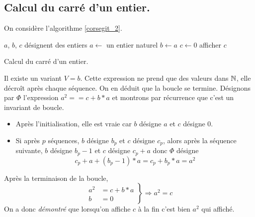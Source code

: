\subsection{Calcul du carré d'un entier.}
On considère l'algorithme \ref{corsegit_2}.
\begin{algorithm}
  $a$, $b$, $c$ désignent des entiers\;
  $a\longleftarrow$ un entier naturel\;
  $b\longleftarrow a$\;
  $c\longleftarrow 0$\;
  afficher $c$\;
  \caption{Calcul du carré d'un entier.}
  \label{corsegit_2}
\end{algorithm}
Il existe un variant $V = b$. Cette expression ne prend que des valeurs dans $\mathbb{N}$, elle décroît après chaque séquence. On en déduit que la boucle se termine.\newline
Désignons par $\Phi$ l'expression $a^2 == c +b*a$ et montrons par récurrence que c'est un invariant de boucle.
\begin{itemize}
  \item Après l'initialisation, elle est vraie car $b$ désigne $a$ et $c$ désigne $0$.
  \item Si après $p$ séquences, $b$ désigne $b_p$ et $c$ désigne $c_p$, alors après la séquence suivante, $b$ désigne $b_p-1$ et $c$ désigne $c_p+a$ donc $\Phi$ désigne
  \begin{displaymath}
   c_p + a + (b_p-1)*a = c_p + b_p*a = a^2 
  \end{displaymath}
\end{itemize}
Après la terminaison de la boucle,
\begin{displaymath}
  \left. 
  \begin{aligned}
a^2 &= c + b*a \\ b&=0     
  \end{aligned}
\right\rbrace 
\Rightarrow a^2 = c
\end{displaymath}
On a donc \emph{démontré} que lorsqu'on affiche $c$ à la fin c'est bien $a^2$ qui affiché.

